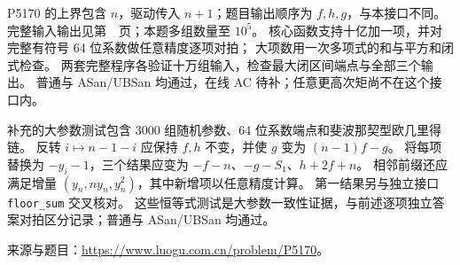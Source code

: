P5170 的上界包含 $n$，驱动传入 $n+1$；题目输出顺序为 $f,h,g$，与本接口不同。
完整输入输出见第~\pageref{usage-example-157}~页；本题多组数量至 $10^5$。
核心函数支持十亿加一项，并对完整有符号 64 位系数做任意精度逐项对拍；
大项数用一次多项式的和与平方和闭式检查。
两套完整程序各验证十万组输入，检查最大闭区间端点与全部三个输出。
普通与 ASan/UBSan 均通过，在线 AC 待补；任意更高次矩尚不在这个接口内。

补充的大参数测试包含 3000 组随机参数、64 位系数端点和斐波那契型欧几里得链。
反转 $i\mapsto n-1-i$ 应保持 $f,h$ 不变，并使 $g$ 变为 $(n-1)f-g$。
将每项替换为 $-y_i-1$，三个结果应变为 $-f-n$、$-g-S_1$、$h+2f+n$。
相邻前缀还应满足增量 $(y_n,ny_n,y_n^2)$，其中新增项以任意精度计算。
第一结果另与独立接口 \texttt{floor\_sum} 交叉核对。
这些恒等式测试是大参数一致性证据，与前述逐项独立答案对拍区分记录；普通与 ASan/UBSan 均通过。

来源与题目：\url{https://www.luogu.com.cn/problem/P5170}。

